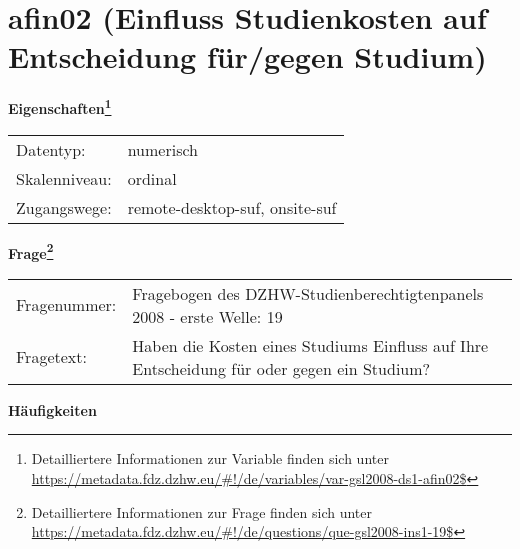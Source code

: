 
    \setcounter{footnote}{0}

    \vspace*{-1.8cm}
	\section{afin02 (Einfluss Studienkosten auf Entscheidung für/gegen Studium)}
	\label{section:afin02}



    \vspace*{0.5cm}
    \noindent\textbf{Eigenschaften\footnote{Detailliertere Informationen zur Variable finden sich unter
		\url{https://metadata.fdz.dzhw.eu/\#!/de/variables/var-gsl2008-ds1-afin02$}}}\\
	\begin{tabularx}{\hsize}{@{}lX}
	Datentyp: & numerisch \\
	Skalenniveau: & ordinal \\
	Zugangswege: &
	  remote-desktop-suf, 
	  onsite-suf
 \\
    \end{tabularx}



				\vspace*{0.5cm}
                \noindent\textbf{Frage\footnote{Detailliertere Informationen zur Frage finden sich unter
		              \url{https://metadata.fdz.dzhw.eu/\#!/de/questions/que-gsl2008-ins1-19$}}}\\
				\begin{tabularx}{\hsize}{@{}lX}
					Fragenummer: &
					  Fragebogen des DZHW-Studienberechtigtenpanels 2008 - erste Welle:
					  19
 \\
					Fragetext: & Haben die Kosten eines Studiums Einfluss auf Ihre Entscheidung für oder gegen ein Studium? \\
				\end{tabularx}





        		\vspace*{0.5cm}
                \noindent\textbf{Häufigkeiten}

